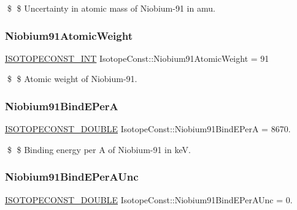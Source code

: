 \$ \$ Uncertainty in atomic mass of Niobium-\/91 in amu. \mbox{\label{group___isotope_const-_niobium-_nb91_gac119e910133b8d0a5c9082a9abc3e764}} 
\subsubsection{\texorpdfstring{Niobium91\+Atomic\+Weight}{Niobium91AtomicWeight}}
{\footnotesize\ttfamily \mbox{\hyperlink{group___isotope_const-_macros_ga5f18360b3e99483a35c32d789e62621c}{I\+S\+O\+T\+O\+P\+E\+C\+O\+N\+S\+T\+\_\+\+I\+NT}} Isotope\+Const\+::\+Niobium91\+Atomic\+Weight = 91}

\$ \$ Atomic weight of Niobium-\/91. \mbox{\label{group___isotope_const-_niobium-_nb91_ga1edb0cf90819227e8c8d99a0522e9473}} 
\subsubsection{\texorpdfstring{Niobium91\+Bind\+E\+PerA}{Niobium91BindEPerA}}
{\footnotesize\ttfamily \mbox{\hyperlink{group___isotope_const-_macros_ga8f45a7272ce02c0b4c65c44636ed719a}{I\+S\+O\+T\+O\+P\+E\+C\+O\+N\+S\+T\+\_\+\+D\+O\+U\+B\+LE}} Isotope\+Const\+::\+Niobium91\+Bind\+E\+PerA = 8670.}

\$ \$ Binding energy per A of Niobium-\/91 in keV. \mbox{\label{group___isotope_const-_niobium-_nb91_ga14ef949f4976aacdfaceebe8faf51dee}} 
\subsubsection{\texorpdfstring{Niobium91\+Bind\+E\+Per\+A\+Unc}{Niobium91BindEPerAUnc}}
{\footnotesize\ttfamily \mbox{\hyperlink{group___isotope_const-_macros_ga8f45a7272ce02c0b4c65c44636ed719a}{I\+S\+O\+T\+O\+P\+E\+C\+O\+N\+S\+T\+\_\+\+D\+O\+U\+B\+LE}} Isotope\+Const\+::\+Niobium91\+Bind\+E\+Per\+A\+Unc = 0.}

